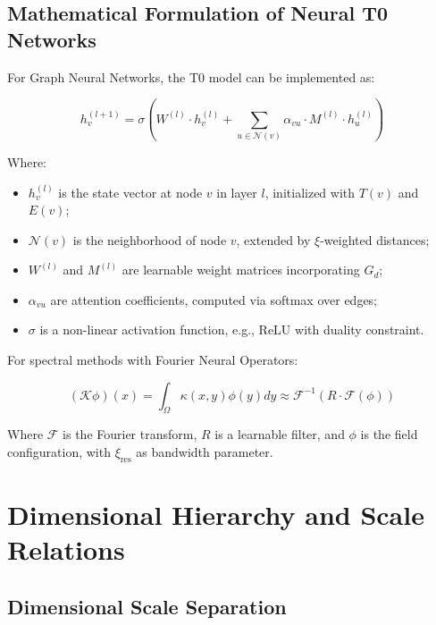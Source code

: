 	\subsection{Mathematical Formulation of Neural T0 Networks}
	\label{subsec:mathematical_neural}
	
	For Graph Neural Networks, the T0 model can be implemented as:
	
	\begin{equation}
		h_v^{(l+1)} = \sigma\left(W^{(l)} \cdot h_v^{(l)} + \sum_{u \in \mathcal{N}(v)} \alpha_{vu} \cdot M^{(l)} \cdot h_u^{(l)}\right)
	\end{equation}
	
	Where:
	\begin{itemize}
		\item $h_v^{(l)}$ is the state vector at node $v$ in layer $l$, initialized with $T(v)$ and $E(v)$;
		\item $\mathcal{N}(v)$ is the neighborhood of node $v$, extended by $\xi$-weighted distances;
		\item $W^{(l)}$ and $M^{(l)}$ are learnable weight matrices incorporating $G_d$;
		\item $\alpha_{vu}$ are attention coefficients, computed via softmax over edges;
		\item $\sigma$ is a non-linear activation function, e.g., ReLU with duality constraint.
	\end{itemize}
	
	For spectral methods with Fourier Neural Operators:
	
	\begin{equation}
		(\mathcal{K}\phi)(x) = \int_{\Omega} \kappa(x,y) \phi(y) dy \approx \mathcal{F}^{-1}(R \cdot \mathcal{F}(\phi))
	\end{equation}
	
	Where $\mathcal{F}$ is the Fourier transform, $R$ is a learnable filter, and $\phi$ is the field configuration, with $\xi_{\text{res}}$ as bandwidth parameter.
	
	\section{Dimensional Hierarchy and Scale Relations}
	\label{sec:dimensional_hierarchy}
	
	\subsection{Dimensional Scale Separation}
	\label{subsec:scale_separation}
	
